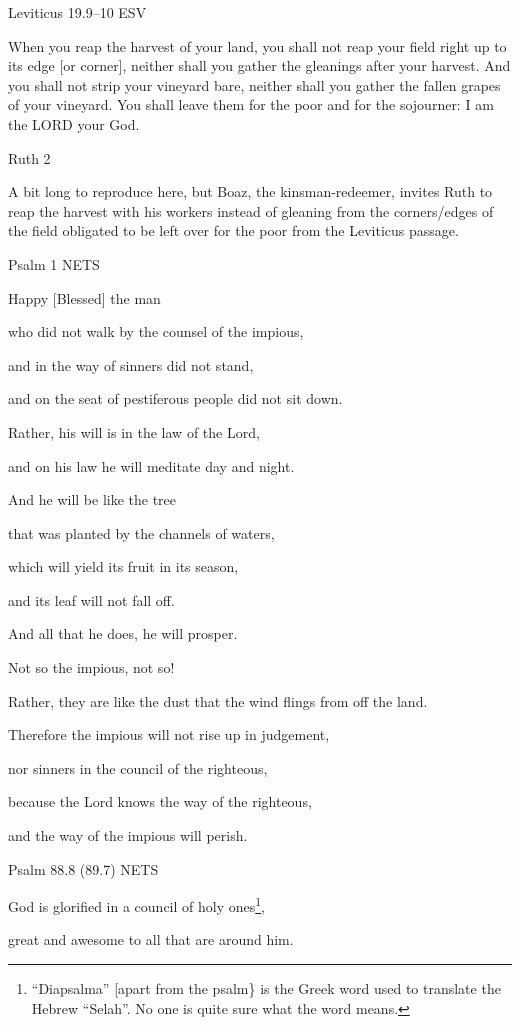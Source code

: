 \documentclass[
]{article}
\begin{document}
Leviticus 19.9--10 ESV

When you reap the harvest of your land, you shall not reap your field
right up to its edge {[}or corner{]}, neither shall you gather the
gleanings after your harvest. And you shall not strip your vineyard
bare, neither shall you gather the fallen grapes of your vineyard. You
shall leave them for the poor and for the sojourner: I am the LORD your
God.

Ruth 2

A bit long to reproduce here, but Boaz, the kinsman-redeemer, invites
Ruth to reap the harvest with his workers instead of gleaning from the
corners/edges of the field obligated to be left over for the poor from
the Leviticus passage.

Psalm 1 NETS

Happy {[}Blessed{]} the man

who did not walk by the counsel of the impious,

and in the way of sinners did not stand,

and on the seat of pestiferous people did not sit down.

Rather, his will is in the law of the Lord,

and on his law he will meditate day and night.

And he will be like the tree

that was planted by the channels of waters,

which will yield its fruit in its season,

and its leaf will not fall off.

And all that he does, he will prosper.

Not so the impious, not so!

Rather, they are like the dust that the wind flings from off the land.

Therefore the impious will not rise up in judgement,

nor sinners in the council of the righteous,

because the Lord knows the way of the righteous,

and the way of the impious will perish.

Psalm 88.8 (89.7) NETS

God is glorified in a council of holy ones\footnote{``Diapsalma''
  {[}apart from the psalm\} is the Greek word used to translate the
  Hebrew ``Selah''. No one is quite sure what the word means.},

great and awesome to all that are around him.
\end{document}
